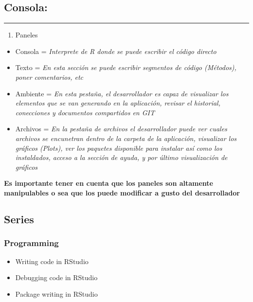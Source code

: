 \documentclass[]{article}
\providecommand{\tightlist}{%
  \setlength{\itemsep}{0pt}\setlength{\parskip}{0pt}}
\begin{document}
\subsection{Consola:}\label{consola}

\begin{center}\rule{0.5\linewidth}{\linethickness}\end{center}

\begin{enumerate}
\def\labelenumi{\arabic{enumi}.}
\tightlist
\item
  Paneles
\end{enumerate}

\begin{itemize}
\tightlist
\item
  Consola = \emph{Interprete de R donde se puede escribir el código
  directo}
\item
  Texto = \emph{En esta sección se puede escribir segmentos de código
  (Métodos), poner comentarios, etc}
\item
  Ambiente = \emph{En esta pestaña, el desarrollador es capaz de
  visualizar los elementos que se van generando en la aplicación,
  revisar el historial, conecciones y documentos compartidos en GIT}
\item
  Archivos = \emph{En la pestaña de archivos el desarrollador puede ver
  cuales archivos se encunetran dentro de la carpeta de la aplicación,
  visualizar los gráficos (Plots), ver los paquetes disponible para
  instalar así como los instaldados, acceso a la sección de ayuda, y por
  último visualización de gráficos}
\end{itemize}

\textbf{Es importante tener en cuenta que los paneles son altamente
manipulables o sea que los puede modificar a gusto del desarrollador}

\subsection{Series}\label{series}

\subsubsection{\texorpdfstring{\textbf{Programming}}{Programming}}\label{programming}

\begin{itemize}
\tightlist
\item
  Writing code in RStudio
\item
  Debugging code in RStudio
\item
  Package writing in RStudio
\end{itemize}
\end{document}
